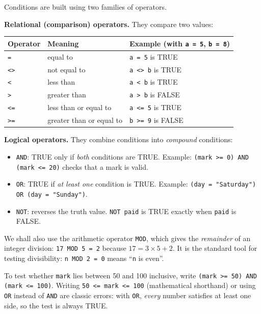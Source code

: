 \documentclass[11pt]{article}
\begin{document}
Conditions are built using two families of operators.

\textbf{Relational (comparison) operators.} They compare two values:

\begin{center}
\begin{tabularx}{\linewidth}{|l|l|X|}
\hline
\rowcolor{popblueL} \textbf{Operator} & \textbf{Meaning} & \textbf{Example (with \texttt{a = 5}, \texttt{b = 8})} \\
\hline
\texttt{=} & equal to & \texttt{a = 5} is TRUE \\
\hline
\texttt{<>} & not equal to & \texttt{a <> b} is TRUE \\
\hline
\texttt{<} & less than & \texttt{a < b} is TRUE \\
\hline
\texttt{>} & greater than & \texttt{a > b} is FALSE \\
\hline
\texttt{<=} & less than or equal to & \texttt{a <= 5} is TRUE \\
\hline
\texttt{>=} & greater than or equal to & \texttt{b >= 9} is FALSE \\
\hline
\end{tabularx}
\end{center}

\textbf{Logical operators.} They combine conditions into \emph{compound} conditions:

\begin{itemize}
\item \texttt{AND}: TRUE only if \emph{both} conditions are TRUE. Example: \texttt{(mark >= 0) AND (mark <= 20)} checks that a mark is valid.
\item \texttt{OR}: TRUE if \emph{at least one} condition is TRUE. Example: \texttt{(day = "Saturday") OR (day = "Sunday")}.
\item \texttt{NOT}: reverses the truth value. \texttt{NOT paid} is TRUE exactly when \texttt{paid} is FALSE.
\end{itemize}

We shall also use the arithmetic operator \texttt{MOD}, which gives the \emph{remainder} of an integer division: \texttt{17 MOD 5 = 2} because $17 = 3 \times 5 + 2$. It is the standard tool for testing divisibility: \texttt{n MOD 2 = 0} means ``\texttt{n} is even''.

\begin{attention}
To test whether \texttt{mark} lies between 50 and 100 inclusive, write \texttt{(mark >= 50) AND (mark <= 100)}. Writing \texttt{50 <= mark <= 100} (mathematical shorthand) or using \texttt{OR} instead of \texttt{AND} are classic errors: with \texttt{OR}, \emph{every} number satisfies at least one side, so the test is always TRUE.
\end{attention}
\end{document}
